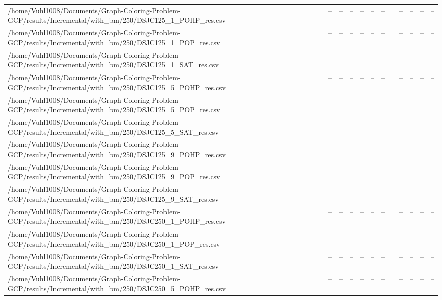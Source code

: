 \begin{table}[htbp]
\begin{tabular}{llllllllllll}
/home/Vuhl1008/Documents/Graph-Coloring-Problem-GCP/results/Incremental/with\_bm/250/DSJC125\_1\_POHP\_res.csv & -- & -- & -- & -- & -- & -- & {} & -- & -- & -- & -- \\
/home/Vuhl1008/Documents/Graph-Coloring-Problem-GCP/results/Incremental/with\_bm/250/DSJC125\_1\_POP\_res.csv & -- & -- & -- & -- & -- & -- & {} & -- & -- & -- & -- \\
/home/Vuhl1008/Documents/Graph-Coloring-Problem-GCP/results/Incremental/with\_bm/250/DSJC125\_1\_SAT\_res.csv & -- & -- & -- & -- & -- & -- & {} & -- & -- & -- & -- \\
/home/Vuhl1008/Documents/Graph-Coloring-Problem-GCP/results/Incremental/with\_bm/250/DSJC125\_5\_POHP\_res.csv & -- & -- & -- & -- & -- & -- & {} & -- & -- & -- & -- \\
/home/Vuhl1008/Documents/Graph-Coloring-Problem-GCP/results/Incremental/with\_bm/250/DSJC125\_5\_POP\_res.csv & -- & -- & -- & -- & -- & -- & {} & -- & -- & -- & -- \\
/home/Vuhl1008/Documents/Graph-Coloring-Problem-GCP/results/Incremental/with\_bm/250/DSJC125\_5\_SAT\_res.csv & -- & -- & -- & -- & -- & -- & {} & -- & -- & -- & -- \\
/home/Vuhl1008/Documents/Graph-Coloring-Problem-GCP/results/Incremental/with\_bm/250/DSJC125\_9\_POHP\_res.csv & -- & -- & -- & -- & -- & -- & {} & -- & -- & -- & -- \\
/home/Vuhl1008/Documents/Graph-Coloring-Problem-GCP/results/Incremental/with\_bm/250/DSJC125\_9\_POP\_res.csv & -- & -- & -- & -- & -- & -- & {} & -- & -- & -- & -- \\
/home/Vuhl1008/Documents/Graph-Coloring-Problem-GCP/results/Incremental/with\_bm/250/DSJC125\_9\_SAT\_res.csv & -- & -- & -- & -- & -- & -- & {} & -- & -- & -- & -- \\
/home/Vuhl1008/Documents/Graph-Coloring-Problem-GCP/results/Incremental/with\_bm/250/DSJC250\_1\_POHP\_res.csv & -- & -- & -- & -- & -- & -- & {} & -- & -- & -- & -- \\
/home/Vuhl1008/Documents/Graph-Coloring-Problem-GCP/results/Incremental/with\_bm/250/DSJC250\_1\_POP\_res.csv & -- & -- & -- & -- & -- & -- & {} & -- & -- & -- & -- \\
/home/Vuhl1008/Documents/Graph-Coloring-Problem-GCP/results/Incremental/with\_bm/250/DSJC250\_1\_SAT\_res.csv & -- & -- & -- & -- & -- & -- & {} & -- & -- & -- & -- \\
/home/Vuhl1008/Documents/Graph-Coloring-Problem-GCP/results/Incremental/with\_bm/250/DSJC250\_5\_POHP\_res.csv & -- & -- & -- & -- & -- & -- & {} & -- & -- & -- & -- \\

\end{tabular}
\end{table}
